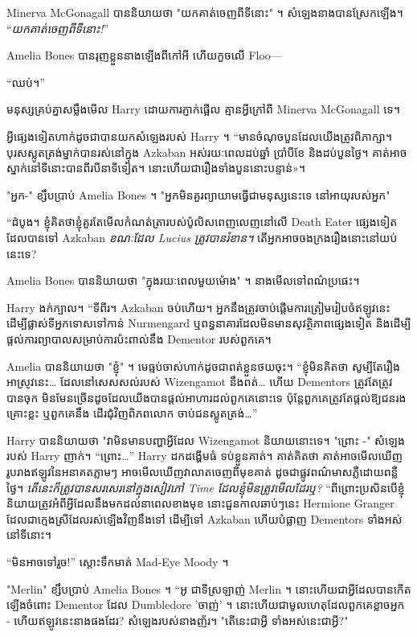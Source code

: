 Minerva McGonagall បាននិយាយថា "យកគាត់ចេញពីទីនោះ" ។ សំឡេង​នាង​បាន​ស្រែក​ឡើង។ “\emph{យកគាត់ចេញពីទីនោះ!}”

Amelia Bones បាន​រុញ​ខ្លួន​នាង​ឡើង​ពី​កៅអី ហើយ​កួច​លើ Floo—

“ឈប់។”

មនុស្សគ្រប់គ្នាសម្លឹងមើល Harry ដោយការភ្ញាក់ផ្អើល គ្មានអ្វីក្រៅពី Minerva McGonagall ទេ។

អ្វី​ផ្សេង​ទៀត​ហាក់​ដូច​ជា​បាន​យក​សំឡេង​របស់ Harry ។ “មាន​ចំណុច​បួន​ដែល​យើង​ត្រូវ​ពិភាក្សា។ បុរសស្លូតត្រង់ម្នាក់បានរស់នៅក្នុង Azkaban អស់រយៈពេលដប់ឆ្នាំ ប្រាំបីខែ និងដប់បួនថ្ងៃ។ គាត់អាចស្នាក់នៅទីនោះបានពីរបីនាទីទៀត។ នោះ​ហើយ​ជា​រឿង​ទាំង​បួន​នោះ​បន្ទាន់»។

"អ្នក-" ខ្សឹបប្រាប់ Amelia Bones ។ "អ្នកមិនគួរព្យាយាមធ្វើជាមនុស្សនេះទេ នៅអាយុរបស់អ្នក"

“ដំបូង។ ខ្ញុំ​គិត​ថា​ខ្ញុំ​គួរ​តែ​មើល​កំណត់ត្រា​របស់​ប៉ូលិស​ពេញលេញ​នៅ​លើ​ Death Eater ផ្សេង​ទៀត​ដែល​បាន​ទៅ Azkaban \emph{ខណៈ​ដែល Lucius ត្រូវ​បាន​រំខាន។} តើ​អ្នក​អាច​ចងក្រង​រឿង​នោះ​នៅ​យប់​នេះ​ទេ?

Amelia Bones បាននិយាយថា "ក្នុងរយៈពេលមួយម៉ោង" ។ នាងមើលទៅពណ៌ប្រផេះ។

Harry ងក់ក្បាល។ “ទីពីរ។ Azkaban ចប់ហើយ។ អ្នកនឹងត្រូវចាប់ផ្តើមការត្រៀមរៀបចំឥឡូវនេះ ដើម្បីផ្លាស់ទីអ្នកទោសទៅកាន់ Nurmengard ឬពន្ធនាគារដែលមិនមានសុវត្ថិភាពផ្សេងទៀត និងដើម្បីផ្តល់ការព្យាបាលសម្រាប់ការប៉ះពាល់នឹង Dementor របស់ពួកគេ។

Amelia បាននិយាយថា "ខ្ញុំ" ។ មេធ្មប់ចាស់ហាក់ដូចជាពត់ខ្លួនថយចុះ។ “ខ្ញុំមិនគិតថា សូម្បីតែរឿងអាស្រូវនេះ… ដែលនៅសេសសល់របស់ Wizengamot នឹងពត់… ហើយ Dementors ត្រូវតែត្រូវបានចុក មិនមែនច្រើនដូចដែលយើងបានផ្តល់អាហារដល់ពួកគេនោះទេ ប៉ុន្តែពួកគេត្រូវតែផ្តល់ឱ្យជនរងគ្រោះខ្លះ ឬពួកគេនឹង ដើរជុំវិញពិភពលោក ចាប់ជនស្លូតត្រង់…”

Harry បាននិយាយថា "វាមិនមានបញ្ហាអ្វីដែល Wizengamot និយាយនោះទេ។ "ព្រោះ -" សំឡេងរបស់ Harry ញាក់។ “ព្រោះ…” Harry ដកដង្ហើមធំ ទប់ខ្លួនគាត់។ គាត់​គិត​ថា គាត់​អាច​មើល​ឃើញ​រូបរាង​ឥឡូវ​នៃ​អនាគត​ភ្លាមៗ អាច​មើល​ឃើញ​វា​លាត​ចេញ​ពី​មុខ​គាត់ ដូច​ជា​ផ្លូវ​ពណ៌​មាស​ភ្លឺ​ដោយ​ពន្លឺ​ថ្ងៃ។ \emph{តើនេះក៏ត្រូវបានសរសេរនៅក្នុងសៀវភៅ Time ដែលខ្ញុំមិនត្រូវមើលដែរឬ?} “ពីព្រោះប្រសិនបើខ្ញុំនិយាយត្រូវអំពីអ្វីដែលនឹងមកដល់នាពេលខាងមុខ នោះជួនកាលឆាប់ៗនេះ Hermione Granger ដែលជាក្មេងស្រីដែលរស់ឡើងវិញនឹងទៅ ដើម្បីទៅ Azkaban ហើយបំផ្លាញ Dementors ទាំងអស់នៅទីនោះ។

“មិនអាចទៅរួច!” ស្ដោះទឹកមាត់ Mad-Eye Moody ។

"Merlin" ខ្សឹបប្រាប់ Amelia Bones ។ “អូ ជាទីស្រឡាញ់ Merlin ។ នោះហើយជាអ្វីដែលបានកើតឡើងចំពោះ Dementor ដែល Dumbledore 'ចាញ់' ។ នោះហើយជាមូលហេតុដែលពួកគេខ្លាចអ្នក - ហើយឥឡូវនេះនាងផងដែរ? សំឡេងរបស់នាងញ័រ។ "តើនេះជាអ្វី ទាំងអស់នេះជាអ្វី?"

